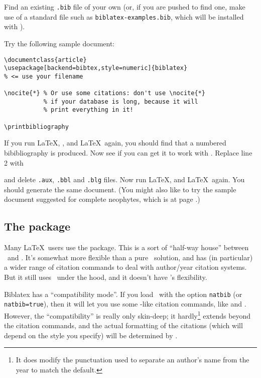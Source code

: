Find an existing \verb|.bib| file of your own (or, if you are pushed to find one, make use of a standard file such as \verb|biblatex-examples.bib|, which will be installed with \biblatex).

Try the following sample document:

\begin{verbatim}
\documentclass{article}
\usepackage[backend=bibtex,style=numeric]{biblatex}
% <= use your filename

\nocite{*} % Or use some citations: don't use \nocite{*}
           % if your database is long, because it will
           % print everything in it!

\printbibliography

\end{verbatim}

If you run \LaTeX, \bibtex, and \LaTeX\ again, you should find that a numbered bibibliography is produced. Now see if you can get it to work with . Replace line 2 with
\begin{center}
\end{center}
and delete \verb|.aux|, \verb|.bbl| and \verb|.blg| files. Now run \LaTeX,  and \LaTeX\ again. You should generate the same document. (You might also like to try the sample document suggested for complete neophytes, which is at page \pageref{neophyte:example}.)

\subsection{The  package}

Many \LaTeX\ users use the  package. This is a sort of ``half-way house'' between \bibtex\ and \biblatex. It's somewhat more flexible than a pure \bibtex\ solution, and has (in particular) a wider range of citation commands to deal with author\slash year citation systems. But it still uses \bibtex\ under the hood, and it doesn't have \biblatex's flexibility.

Biblatex has a  ``compatibility mode''. If you load \biblatex\ with the option \texttt{natbib} (or \texttt{natbib\allowbreak =\allowbreak true}), then it will let you use some -like citation commands, like  and . However, the ``compatibility'' is really only skin-deep; it hardly\footnote{It does modify the punctuation used to separate an author's name from the year to match the  default.} extends beyond the citation commands, and the actual formatting of the citations (which will depend on the style you specify) will be determined by \biblatex.
